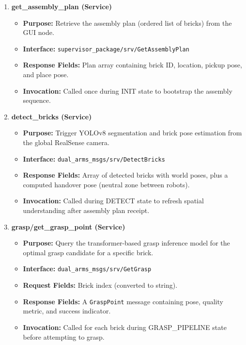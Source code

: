 \begin{enumerate}
    \item \textbf{get\_assembly\_plan (Service)}
    \begin{itemize}
        \item \textbf{Purpose:} Retrieve the assembly plan (ordered list of bricks) from the GUI node.
        \item \textbf{Interface:} \texttt{supervisor\_package/srv/GetAssemblyPlan}
        \item \textbf{Response Fields:} Plan array containing brick ID, location, pickup pose, and place pose.
        \item \textbf{Invocation:} Called once during INIT state to bootstrap the assembly sequence.
    \end{itemize}

    \item \textbf{detect\_bricks (Service)}
    \begin{itemize}
        \item \textbf{Purpose:} Trigger YOLOv8 segmentation and brick pose estimation from the global RealSense camera.
        \item \textbf{Interface:} \texttt{dual\_arms\_msgs/srv/DetectBricks}
        \item \textbf{Response Fields:} Array of detected bricks with world poses, plus a computed handover pose (neutral zone between robots).
        \item \textbf{Invocation:} Called during DETECT state to refresh spatial understanding after assembly plan receipt.
    \end{itemize}

    \item \textbf{grasp/get\_grasp\_point (Service)}
    \begin{itemize}
        \item \textbf{Purpose:} Query the transformer-based grasp inference model for the optimal grasp candidate for a specific brick.
        \item \textbf{Interface:} \texttt{dual\_arms\_msgs/srv/GetGrasp}
        \item \textbf{Request Fields:} Brick index (converted to string).
        \item \textbf{Response Fields:} A \texttt{GraspPoint} message containing pose, quality metric, and success indicator.
        \item \textbf{Invocation:} Called for each brick during GRASP\_PIPELINE state before attempting to grasp.
    \end{itemize}
\end{enumerate}

